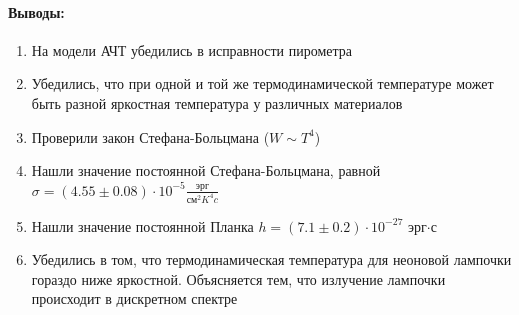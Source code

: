 \documentclass[a4paper,12pt]{article}
\begin{document}
\paragraph{Выводы:}
\begin{enumerate}
\item На модели АЧТ убедились в исправности пирометра
\item Убедились, что при одной и той же термодинамической температуре может быть разной яркостная температура у различных материалов
\item Проверили закон Стефана-Больцмана ($W \sim T^4$)
\item Нашли значение постоянной Стефана-Больцмана, равной $\sigma = (4.55\pm 0.08)\cdot 10^{-5} \frac{\text{эрг}}{\text{см}^2K^4c}$
\item Нашли значение постоянной Планка $h = (7.1 \pm 0.2)\cdot 10^{-27}$ эрг$\cdot$с
\item Убедились в том, что термодинамическая температура для неоновой лампочки гораздо ниже яркостной. Объясняется тем, что излучение лампочки происходит в дискретном спектре
\end{enumerate}
\end{document}
